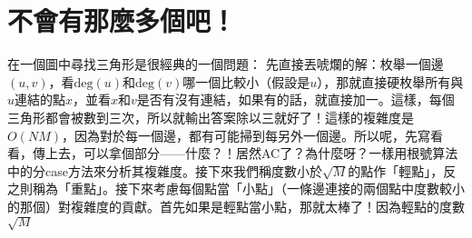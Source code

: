 \section{不會有那麼多個吧！}
	在一個圖中尋找三角形是很經典的一個問題：
	先直接丟唬爛的解：枚舉一個邊$(u, v)$，看$\text{deg}(u)$和$\text{deg}(v)$哪一個比較小（假設是$u$），那就直接硬枚舉所有與$u$連結的點$x$，並看$x$和$v$是否有沒有連結，如果有的話，就直接加一。這樣，每個三角形都會被數到三次，所以就輸出答案除以三就好了！這樣的複雜度是$O(NM)$，因為對於每一個邊，都有可能掃到每另外一個邊。所以呢，先寫看看，傳上去，可以拿個部分——什麼？！居然AC了？為什麼呀？一樣用根號算法中的分case方法來分析其複雜度。接下來我們稱度數小於$\sqrt{M}$的點作「輕點」，反之則稱為「重點」。接下來考慮每個點當「小點」（一條邊連接的兩個點中度數較小的那個）對複雜度的貢獻。首先如果是輕點當小點，那就太棒了！因為輕點的度數$\sqrt{M}$
